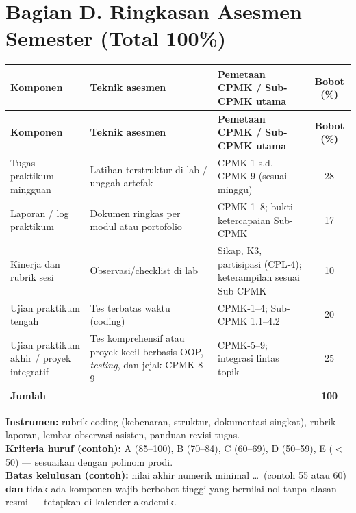 \documentclass[12pt,a4paper]{article}
\begin{document}
\vspace{0.75cm}

\section*{Bagian D. Ringkasan Asesmen Semester (Total 100\%)}

\begin{longtable}{|>{\raggedright\arraybackslash}p{3cm}|>{\raggedright\arraybackslash}p{4.2cm}|>{\raggedright\arraybackslash}p{5.8cm}|c|}
\hline
\textbf{Komponen} & \textbf{Teknik asesmen} & \textbf{Pemetaan CPMK / Sub-CPMK utama} & \textbf{Bobot (\%)} \\
\hline
\endfirsthead
\hline
\textbf{Komponen} & \textbf{Teknik asesmen} & \textbf{Pemetaan CPMK / Sub-CPMK utama} & \textbf{Bobot (\%)} \\
\hline
\endhead
\hline
\endfoot

Tugas praktikum mingguan & Latihan terstruktur di lab / unggah artefak & CPMK-1 s.d. CPMK-9 (sesuai minggu) & 28 \\
\hline
Laporan / log praktikum & Dokumen ringkas per modul atau portofolio & CPMK-1--8; bukti ketercapaian Sub-CPMK & 17 \\
\hline
Kinerja dan rubrik sesi & Observasi/checklist di lab & Sikap, K3, partisipasi (CPL-4); keterampilan sesuai Sub-CPMK & 10 \\
\hline
Ujian praktikum tengah & Tes terbatas waktu (coding) & CPMK-1--4; Sub-CPMK 1.1--4.2 & 20 \\
\hline
Ujian praktikum akhir / proyek integratif & Tes komprehensif atau proyek kecil berbasis OOP, \textit{testing}, dan jejak CPMK-8--9 & CPMK-5--9; integrasi lintas topik & 25 \\
\hline
\textbf{Jumlah} & & & \textbf{100} \\
\hline
\end{longtable}

\noindent\textbf{Instrumen:} rubrik coding (kebenaran, struktur, dokumentasi singkat), rubrik laporan, lembar observasi asisten, panduan revisi tugas.\\
\noindent\textbf{Kriteria huruf (contoh):} A (85--100), B (70--84), C (60--69), D (50--59), E ($<$50) --- sesuaikan dengan polinom prodi.\\
\noindent\textbf{Batas kelulusan (contoh):} nilai akhir numerik minimal \ldots\ (contoh 55 atau 60) \textbf{dan} tidak ada komponen wajib berbobot tinggi yang bernilai nol tanpa alasan resmi --- tetapkan di kalender akademik.
\end{document}
